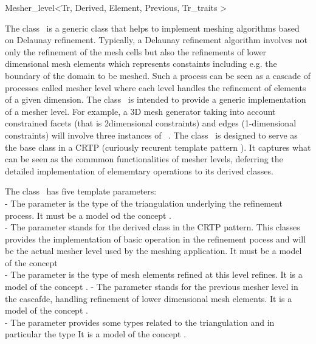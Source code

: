 

\begin{ccRefClass}{Mesher_level<Tr, Derived, Element, Previous,
Tr_traits >}  %


\ccDefinition
  
The class \ccRefName\ is a generic class 
that helps to implement meshing algorithms 
based on Delaunay refinement.
Typically, a  Delaunay refinement algorithm
involves not only  the refinement of the mesh cells
but also the refinements of lower dimensional mesh elements
which represents  constaints including e.g.
the boundary of the domain to be meshed. 
Such a process can be seen
as a cascade of processes called mesher level  where each  level
handles the refinement of elements of a given dimension.
The class  \ccRefName\ is intended to provide a generic implementation
of a mesher level.
For example, a 3D mesh generator taking into account
constrained facets (that is 2dimensional constraints)
and edges (1-dimensional constraints) will involve
three  instances of \ccRefName\ .
The class \ccRefName\ 
is designed to serve as the base class
in a CRTP (curiously recurent template pattern ).
It captures what can be seen as the commmon functionalities
of mesher levels, deferring the  detailed implementation
of elememtary operations to its derived classes.



\ccParameters
The class \ccRefName\ has five template parameters: \\
- The parameter  is the type of the triangulation underlying
 the refinement process. It must be a model od the concept .\\
- The parameter \ccc{Derived} stands for the derived class
in the CRTP pattern. This classes provides the implementation
of basic operation in  the refinement pocess and will be the actual
mesher level used by the meshing application. 
It must be a model of the concept  \\
- The parameter  is the type of mesh elements 
refined at  this level refines. It is a model of the concept
.
- The parameter  stands for the  previous mesher level
 in the cascafde, handling refinement of lower dimensional mesh
elements.  It is a model of the concept
.\\
- The parameter  provides some types related
to the triangulation and in particular the type  
 It is a model of the concept
.


\end{ccRefClass}
